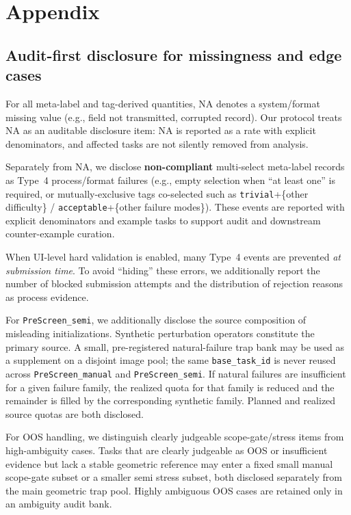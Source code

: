 \section{Appendix}
\label{sec:appendix}

\subsection{Audit-first disclosure for missingness and edge cases}

For all meta-label and tag-derived quantities, NA denotes a system/format missing value (e.g., field not
transmitted, corrupted record). Our protocol treats NA as an auditable disclosure item: NA is reported as
a rate with explicit denominators, and affected tasks are not silently removed from analysis.

Separately from NA, we disclose \textbf{non-compliant} multi-select meta-label records as Type~4
process/format failures (e.g., empty selection when ``at least one'' is required, or mutually-exclusive
tags co-selected such as \texttt{trivial}+\{other difficulty\} / \texttt{acceptable}+\{other failure modes\}).
These events are reported with explicit denominators and example tasks to support audit and downstream
counter-example curation.

When UI-level hard validation is enabled, many Type~4 events are prevented \emph{at submission time}.
To avoid ``hiding'' these errors, we additionally report the number of blocked submission attempts and the
distribution of rejection reasons as process evidence.

For \texttt{PreScreen\_semi}, we additionally disclose the source composition of misleading initializations.
Synthetic perturbation operators constitute the primary source. A small, pre-registered natural-failure trap
bank may be used as a supplement on a disjoint image pool; the same \texttt{base\_task\_id} is never reused
across \texttt{PreScreen\_manual} and \texttt{PreScreen\_semi}. If natural failures are insufficient for a given
failure family, the realized quota for that family is reduced and the remainder is filled by the corresponding
synthetic family. Planned and realized source quotas are both disclosed.

For OOS handling, we distinguish clearly judgeable scope-gate/stress items from high-ambiguity cases. Tasks that
are clearly judgeable as OOS or insufficient evidence but lack a stable geometric reference may enter a fixed small
manual scope-gate subset or a smaller semi stress subset, both disclosed separately from the main geometric trap
pool. Highly ambiguous OOS cases are retained only in an ambiguity audit bank.

